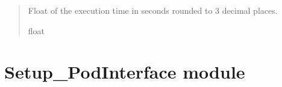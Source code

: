 \documentclass[letterpaper,10pt,english]{sphinxmanual}
\begin{document}
\begin{fulllineitems}
\begin{fulllineitems}
\begin{quote}
\begin{description}
\sphinxAtStartPar
Float of the execution time in seconds rounded to 3 decimal places.

\sphinxAtStartPar
float

\end{description}\end{quote}

\end{fulllineitems}


\end{fulllineitems}


\sphinxstepscope


\section{Setup\_PodInterface module}
\label{\detokenize{Setup_PodInterface:module-Setup_PodInterface}}\label{\detokenize{Setup_PodInterface:setup-podinterface-module}}\label{\detokenize{Setup_PodInterface::doc}}
\end{document}
